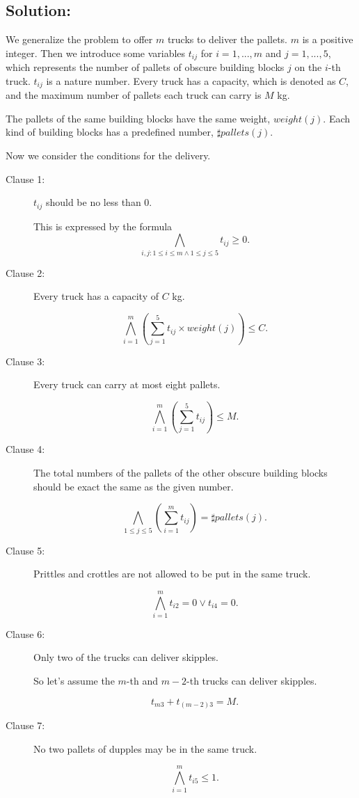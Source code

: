 \documentclass[11pt]{article}
\begin{document}
\vspace{4mm}

\subsection*{Solution:}

We generalize the problem to offer $m$ trucks to deliver the pallets. $m$ is a positive integer. Then we introduce some variables $t_{ij}$ for $i = 1, ..., m$ and $j = 1,...,5$, which represents the number of pallets of obscure building blocks $j$ on the $i$-th truck. $t_{ij}$ is a nature number. Every truck has a capacity, which is denoted as $C$, and the maximum number of pallets each truck can carry is $M$ kg.

The pallets of the same building blocks have the same weight, $weight(j)$. Each kind of building blocks has a predefined number, $\sharp pallets(j)$.

Now we consider the conditions for the delivery.

\begin{description}
  \item[Clause 1:] $t_{ij}$ should be no less than $0$.

  This is expressed by the formula
  \[ \bigwedge_{i,j:1 \leq i \leq m \wedge 1 \leq j \leq 5} t_{ij} \geq 0.\]
  \item[Clause 2:] Every truck has a capacity of $C$ kg.

  \[ \bigwedge_{i=1}^m  (\sum_{j=1}^5 t_{ij} \times weight(j)) \leq C .\]
  \item[Clause 3:] Every truck can carry at most eight pallets.

  \[ \bigwedge_{i=1}^m (\sum_{j=1}^5 t_{ij}) \leq M .\]
  \item[Clause 4:] The total numbers of the pallets of the other obscure building blocks should be exact the same as the given number.

  \[ \bigwedge_{1\leq j \leq 5} (\sum_{i=1}^m t_{ij}) = \sharp pallets(j) .\]

  \item[Clause 5:] Prittles and crottles are not allowed to be put in the same truck.

  \[ \bigwedge_{i=1}^m t_{i2}=0 \vee t_{i4}=0 .\]
  \item[Clause 6:] Only two of the trucks can deliver skipples.

      So let's assume the $m$-th and $m-2$-th trucks can deliver skipples.

  \[ t_{m3} + t_{(m-2)3} = M .\]
  \item[Clause 7:] No two pallets of dupples may be in the same truck.

  \[ \bigwedge_{i=1}^m t_{i5} \leq 1 .\]
\end{description}
\end{document}
